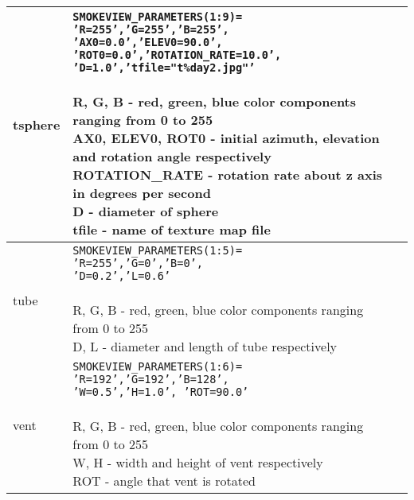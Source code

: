 \begin{longtable}[ht]{|l|l|c|}
tsphere&
\parbox[c]{\boxwidth}{
    {\tt SMOKEVIEW\_PARAMETERS(1:9)=}\\
    {\tt 'R=255','G=255','B=255',}\\
    {\tt 'AX0=0.0','ELEV0=90.0',}\\
    {\tt 'ROT0=0.0','ROTATION\_RATE=10.0',}\\
    {\tt 'D=1.0','tfile="t\%day2.jpg"'}\\ \\
R, G, B - red, green, blue color components ranging from 0 to 255\\
AX0, ELEV0, ROT0 - initial azimuth, elevation and rotation angle respectively\\
ROTATION\_RATE - rotation rate about z axis in degrees per second\\
D - diameter of sphere \\
tfile - name of texture map file

} &
 \\ \hline

tube&
\parbox[c]{\boxwidth}{
{\tt SMOKEVIEW\_PARAMETERS(1:5)=}\\
{\tt 'R=255','G=0','B=0',}\\
{\tt 'D=0.2','L=0.6'}\\ \\
R, G, B - red, green, blue color components ranging from 0 to 255\\
D, L - diameter and length of tube respectively
} &
 \\ \hline

vent&
\parbox[c]{\boxwidth}{
{\tt SMOKEVIEW\_PARAMETERS(1:6)=}\\
{\tt 'R=192','G=192','B=128',}\\
{\tt 'W=0.5','H=1.0', 'ROT=90.0'}\\ \\
R, G, B - red, green, blue color components ranging from 0 to 255\\
W, H - width and height of vent respectively\\
ROT - angle that vent is rotated
} &
 \\ \hline

\end{longtable} 